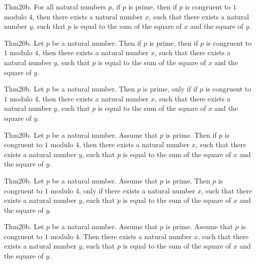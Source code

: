 \documentclass{article}
\begin{document}
Thm20b. For all natural numbers $p$, if $p$ is prime, then if $p$ is congruent to $1$ modulo $4$, then there exists a natural number $x$, such that there exists a natural number $y$, such that $p$ is equal to the sum of the square of $x$ and the square of $y$.

Thm20b. Let $p$ be a natural number. Then if $p$ is prime, then if $p$ is congruent to $1$ modulo $4$, then there exists a natural number $x$, such that there exists a natural number $y$, such that $p$ is equal to the sum of the square of $x$ and the square of $y$.

Thm20b. Let $p$ be a natural number. Then $p$ is prime, only if if $p$ is congruent to $1$ modulo $4$, then there exists a natural number $x$, such that there exists a natural number $y$, such that $p$ is equal to the sum of the square of $x$ and the square of $y$.

Thm20b. Let $p$ be a natural number. Assume that $p$ is prime. Then if $p$ is congruent to $1$ modulo $4$, then there exists a natural number $x$, such that there exists a natural number $y$, such that $p$ is equal to the sum of the square of $x$ and the square of $y$.

Thm20b. Let $p$ be a natural number. Assume that $p$ is prime. Then $p$ is congruent to $1$ modulo $4$, only if there exists a natural number $x$, such that there exists a natural number $y$, such that $p$ is equal to the sum of the square of $x$ and the square of $y$.

Thm20b. Let $p$ be a natural number. Assume that $p$ is prime. Assume that $p$ is congruent to $1$ modulo $4$. Then there exists a natural number $x$, such that there exists a natural number $y$, such that $p$ is equal to the sum of the square of $x$ and the square of $y$.
\end{document}
